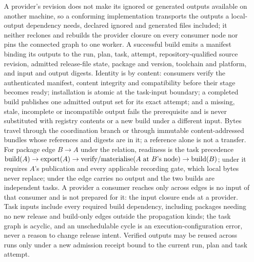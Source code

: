 \begin{definition}
\label{def:exec-outputs}
A provider's revision does not make its ignored or generated outputs
available on another machine, so a conforming implementation transports the
outputs a local-output dependency needs, declared ignored and generated files
included; it neither reclones and rebuilds the provider closure on every
consumer node nor pins the connected graph to one worker. A successful build
emits a manifest binding its outputs to the run, plan, task, attempt,
repository-qualified source revision, admitted release-file state, package and
version, toolchain and platform, and input and output digests. Identity is by
content: consumers verify the authenticated manifest, content integrity and
compatibility before their stage becomes ready; installation is atomic at the
task-input boundary; a completed build publishes one admitted output set for
its exact attempt; and a missing, stale, incomplete or incompatible output
fails the prerequisite and is never substituted with registry contents or a
new build under a different input. Bytes travel through the coordination
branch or through immutable content-addressed bundles whose references and
digests are in it; a reference alone is not a transfer. For package edge $B
\to A$ under the  relation, readiness is the task precedence
$\mathrm{build}(A) \to \mathrm{export}(A) \to \mathrm{verify/materialise}(A
\text{ at } B\text{'s node}) \to \mathrm{build}(B)$; under  it
requires $A$'s publication and every applicable recording gate, which local
bytes never replace; under  the edge carries no output and the two
builds are independent tasks. A provider a consumer reaches only across
 edges is no input of that consumer and is not prepared for it:
the input closure ends at a  provider. Task inputs include every
required build dependency, including packages needing no new release and
build-only edges outside the propagation kinds; the task graph is acyclic,
and an unschedulable cycle is an execution-configuration error, never a
reason to change release intent. Verified outputs may be reused across runs
only under a new admission receipt bound to the current run, plan and task
attempt.
\end{definition}

